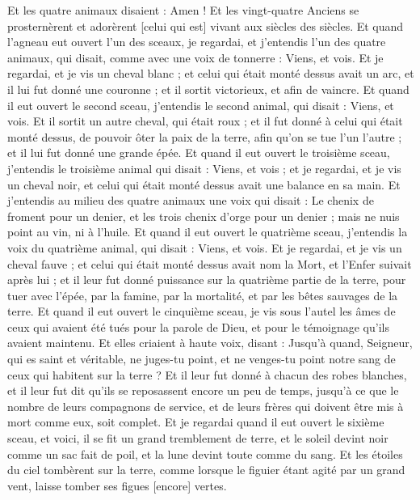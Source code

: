 \begin{multicols}{2}
Et les quatre animaux disaient : Amen ! Et les vingt-quatre Anciens se prosternèrent et adorèrent [celui qui est] vivant aux siècles des siècles.
\VerseOne{}Et quand l'agneau eut ouvert l'un des sceaux, je regardai, et j'entendis l'un des quatre animaux, qui disait, comme avec une voix de tonnerre : Viens, et vois.
Et je regardai, et je vis un cheval blanc ; et celui qui était monté dessus avait un arc, et il lui fut donné une couronne ; et il sortit victorieux, et afin de vaincre.
Et quand il eut ouvert le second sceau, j'entendis le second animal, qui disait : Viens, et vois.
Et il sortit un autre cheval, qui était roux ; et il fut donné à celui qui était monté dessus, de pouvoir ôter la paix de la terre, afin qu'on se tue l'un l'autre ; et il lui fut donné une grande épée.
Et quand il eut ouvert le troisième sceau, j'entendis le troisième animal qui disait : Viens, et vois ; et je regardai, et je vis un cheval noir, et celui qui était monté dessus avait une balance en sa main.
Et j'entendis au milieu des quatre animaux une voix qui disait : Le chenix de froment pour un denier, et les trois chenix d'orge pour un denier ; mais ne nuis point au vin, ni à l'huile.
Et quand il eut ouvert le quatrième sceau, j'entendis la voix du quatrième animal, qui disait : Viens, et vois.
Et je regardai, et je vis un cheval fauve ; et celui qui était monté dessus avait nom la Mort, et l'Enfer suivait après lui ; et il leur fut donné puissance sur la quatrième partie de la terre, pour tuer avec l'épée, par la famine, par la mortalité, et par les bêtes sauvages de la terre.
Et quand il eut ouvert le cinquième sceau, je vis sous l'autel les âmes de ceux qui avaient été tués pour la parole de Dieu, et pour le témoignage qu'ils avaient maintenu.
Et elles criaient à haute voix, disant : Jusqu'à quand, Seigneur, qui es saint et véritable, ne juges-tu point, et ne venges-tu point notre sang de ceux qui habitent sur la terre ?
Et il leur fut donné à chacun des robes blanches, et il leur fut dit qu'ils se reposassent encore un peu de temps, jusqu'à ce que le nombre de leurs compagnons de service, et de leurs frères qui doivent être mis à mort comme eux, soit complet.
Et je regardai quand il eut ouvert le sixième sceau, et voici, il se fit un grand tremblement de terre, et le soleil devint noir comme un sac fait de poil, et la lune devint toute comme du sang.
Et les étoiles du ciel tombèrent sur la terre, comme lorsque le figuier étant agité par un grand vent, laisse tomber ses figues [encore] vertes.

\end{multicols}
